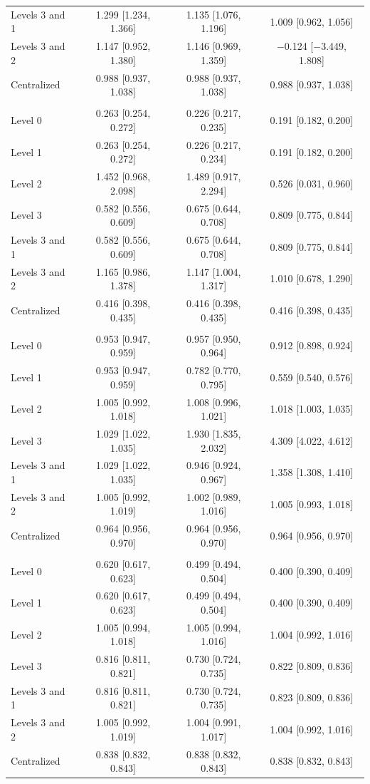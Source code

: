 \begin{tabular}{lccc}
Levels 3 and 1 & 1.299 [1.234, 1.366] & 1.135 [1.076, 1.196] & 1.009 [0.962, 1.056] \\
Levels 3 and 2 & 1.147 [0.952, 1.380] & 1.146 [0.969, 1.359] & $-$0.124 [$-$3.449, 1.808] \\
Centralized & 0.988 [0.937, 1.038] & 0.988 [0.937, 1.038] & 0.988 [0.937, 1.038] \\
\addlinespace
\multicolumn{4}{@{}l}{\textit{Diabetic, XGBoost}} \\
Level 0 & 0.263 [0.254, 0.272] & 0.226 [0.217, 0.235] & 0.191 [0.182, 0.200] \\
Level 1 & 0.263 [0.254, 0.272] & 0.226 [0.217, 0.234] & 0.191 [0.182, 0.200] \\
Level 2 & 1.452 [0.968, 2.098] & 1.489 [0.917, 2.294] & 0.526 [0.031, 0.960] \\
Level 3 & 0.582 [0.556, 0.609] & 0.675 [0.644, 0.708] & 0.809 [0.775, 0.844] \\
Levels 3 and 1 & 0.582 [0.556, 0.609] & 0.675 [0.644, 0.708] & 0.809 [0.775, 0.844] \\
Levels 3 and 2 & 1.165 [0.986, 1.378] & 1.147 [1.004, 1.317] & 1.010 [0.678, 1.290] \\
Centralized & 0.416 [0.398, 0.435] & 0.416 [0.398, 0.435] & 0.416 [0.398, 0.435] \\
\addlinespace
\multicolumn{4}{@{}l}{\textit{Heart, Random Forest}} \\
Level 0 & 0.953 [0.947, 0.959] & 0.957 [0.950, 0.964] & 0.912 [0.898, 0.924] \\
Level 1 & 0.953 [0.947, 0.959] & 0.782 [0.770, 0.795] & 0.559 [0.540, 0.576] \\
Level 2 & 1.005 [0.992, 1.018] & 1.008 [0.996, 1.021] & 1.018 [1.003, 1.035] \\
Level 3 & 1.029 [1.022, 1.035] & 1.930 [1.835, 2.032] & 4.309 [4.022, 4.612] \\
Levels 3 and 1 & 1.029 [1.022, 1.035] & 0.946 [0.924, 0.967] & 1.358 [1.308, 1.410] \\
Levels 3 and 2 & 1.005 [0.992, 1.019] & 1.002 [0.989, 1.016] & 1.005 [0.993, 1.018] \\
Centralized & 0.964 [0.956, 0.970] & 0.964 [0.956, 0.970] & 0.964 [0.956, 0.970] \\
\addlinespace
\multicolumn{4}{@{}l}{\textit{Heart, XGBoost}} \\
Level 0 & 0.620 [0.617, 0.623] & 0.499 [0.494, 0.504] & 0.400 [0.390, 0.409] \\
Level 1 & 0.620 [0.617, 0.623] & 0.499 [0.494, 0.504] & 0.400 [0.390, 0.409] \\
Level 2 & 1.005 [0.994, 1.018] & 1.005 [0.994, 1.016] & 1.004 [0.992, 1.016] \\
Level 3 & 0.816 [0.811, 0.821] & 0.730 [0.724, 0.735] & 0.822 [0.809, 0.836] \\
Levels 3 and 1 & 0.816 [0.811, 0.821] & 0.730 [0.724, 0.735] & 0.823 [0.809, 0.836] \\
Levels 3 and 2 & 1.005 [0.992, 1.019] & 1.004 [0.991, 1.017] & 1.004 [0.992, 1.016] \\
Centralized & 0.838 [0.832, 0.843] & 0.838 [0.832, 0.843] & 0.838 [0.832, 0.843] \\
\bottomrule
\end{tabular}
